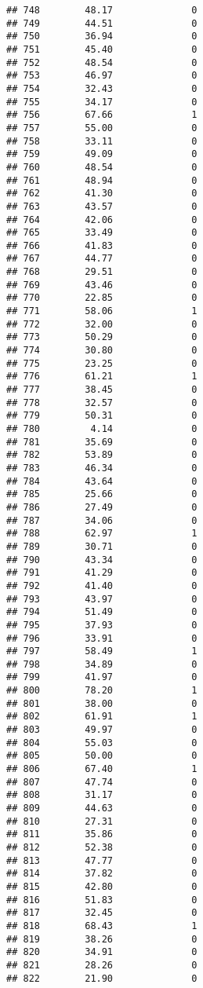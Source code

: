 \documentclass[
]{article}
\begin{document}
\begin{verbatim}
## 748        48.17              0
## 749        44.51              0
## 750        36.94              0
## 751        45.40              0
## 752        48.54              0
## 753        46.97              0
## 754        32.43              0
## 755        34.17              0
## 756        67.66              1
## 757        55.00              0
## 758        33.11              0
## 759        49.09              0
## 760        48.54              0
## 761        48.94              0
## 762        41.30              0
## 763        43.57              0
## 764        42.06              0
## 765        33.49              0
## 766        41.83              0
## 767        44.77              0
## 768        29.51              0
## 769        43.46              0
## 770        22.85              0
## 771        58.06              1
## 772        32.00              0
## 773        50.29              0
## 774        30.80              0
## 775        23.25              0
## 776        61.21              1
## 777        38.45              0
## 778        32.57              0
## 779        50.31              0
## 780         4.14              0
## 781        35.69              0
## 782        53.89              0
## 783        46.34              0
## 784        43.64              0
## 785        25.66              0
## 786        27.49              0
## 787        34.06              0
## 788        62.97              1
## 789        30.71              0
## 790        43.34              0
## 791        41.29              0
## 792        41.40              0
## 793        43.97              0
## 794        51.49              0
## 795        37.93              0
## 796        33.91              0
## 797        58.49              1
## 798        34.89              0
## 799        41.97              0
## 800        78.20              1
## 801        38.00              0
## 802        61.91              1
## 803        49.97              0
## 804        55.03              0
## 805        50.00              0
## 806        67.40              1
## 807        47.74              0
## 808        31.17              0
## 809        44.63              0
## 810        27.31              0
## 811        35.86              0
## 812        52.38              0
## 813        47.77              0
## 814        37.82              0
## 815        42.80              0
## 816        51.83              0
## 817        32.45              0
## 818        68.43              1
## 819        38.26              0
## 820        34.91              0
## 821        28.26              0
## 822        21.90              0

\end{verbatim}
\end{document}

